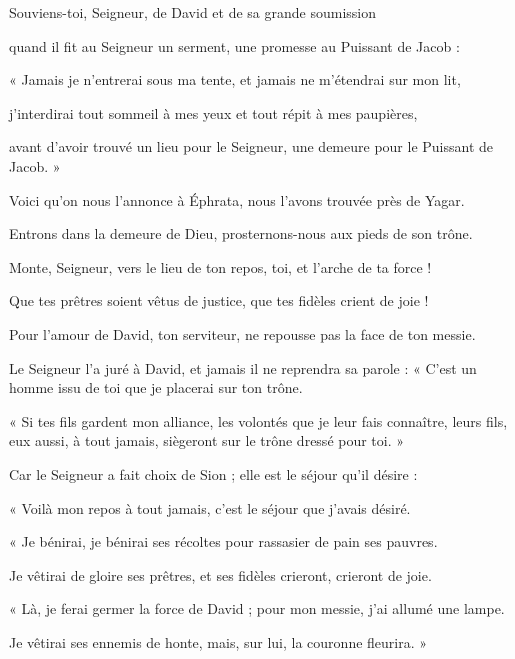 \item Souviens-toi, Seigneur, de David et de sa grande soumission

\item quand il fit au Seigneur un serment, une promesse au Puissant de Jacob :

\item « Jamais je n'entrerai sous ma tente, et jamais ne m'étendrai sur mon lit,

\item j'interdirai tout sommeil à mes yeux et tout répit à mes paupières,

\item avant d'avoir trouvé un lieu pour le Seigneur, une demeure pour le Puissant de Jacob. »

\item Voici qu'on nous l'annonce à Éphrata, nous l'avons trouvée près de Yagar.

\item Entrons dans la demeure de Dieu, prosternons-nous aux pieds de son trône.

\item Monte, Seigneur, vers le lieu de ton repos, toi, et l'arche de ta force !

\item Que tes prêtres soient vêtus de justice, que tes fidèles crient de joie !

\item Pour l'amour de David, ton serviteur, ne repousse pas la face de ton messie.

\item Le Seigneur l'a juré à David, et jamais il ne reprendra sa parole : « C'est un homme issu de toi que je placerai sur ton trône.

\item « Si tes fils gardent mon alliance, les volontés que je leur fais connaître, leurs fils, eux aussi, à tout jamais, siègeront sur le trône dressé pour toi. »

\item Car le Seigneur a fait choix de Sion ; elle est le séjour qu'il désire :

\item « Voilà mon repos à tout jamais, c'est le séjour que j'avais désiré.

\item « Je bénirai, je bénirai ses récoltes pour rassasier de pain ses pauvres.

\item Je vêtirai de gloire ses prêtres, et ses fidèles crieront, crieront de joie.

\item « Là, je ferai germer la force de David ; pour mon messie, j'ai allumé une lampe.

\item Je vêtirai ses ennemis de honte, mais, sur lui, la couronne fleurira. »